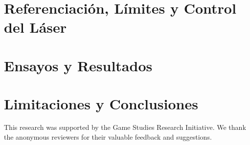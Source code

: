 \documentclass[blue,fullpaper]{ludusofficial}  %
\begin{document}
\section{Referenciación, Límites y Control del Láser}

\section{Ensayos y Resultados}

\section{Limitaciones y Conclusiones}


\begin{acknowledgments}
This research was supported by the Game Studies Research Initiative. We thank the anonymous reviewers for their valuable feedback and suggestions.
\end{acknowledgments}



\end{document}
